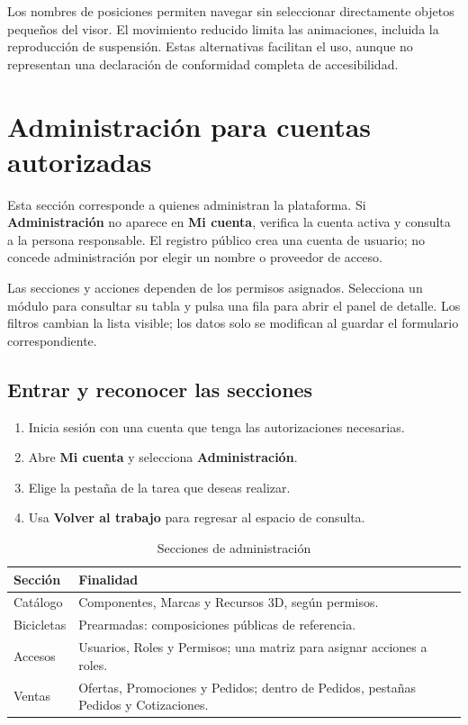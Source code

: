 \documentclass[12pt,letterpaper]{article}
\newenvironment{tabla}{\begingroup\singlespacing\small\setlength{\tabcolsep}{5pt}\renewcommand{\arraystretch}{1.25}}{\endgroup}
\newcommand{\control}[1]{\textbf{#1}}
\begin{document}
Los nombres de posiciones permiten navegar sin seleccionar directamente objetos pequeños del visor. El movimiento reducido limita las animaciones, incluida la reproducción de suspensión. Estas alternativas facilitan el uso, aunque no representan una declaración de conformidad completa de accesibilidad.
\clearpage
\section{Administración para cuentas autorizadas}\label{sec:admin}
Esta sección corresponde a quienes administran la plataforma. Si \control{Administración} no aparece en \control{Mi cuenta}, verifica la cuenta activa y consulta a la persona responsable. El registro público crea una cuenta de usuario; no concede administración por elegir un nombre o proveedor de acceso.

Las secciones y acciones dependen de los permisos asignados. Selecciona un módulo para consultar su tabla y pulsa una fila para abrir el panel de detalle. Los filtros cambian la lista visible; los datos solo se modifican al guardar el formulario correspondiente.

\subsection{Entrar y reconocer las secciones}
\begin{enumerate}
\item Inicia sesión con una cuenta que tenga las autorizaciones necesarias.
\item Abre \control{Mi cuenta} y selecciona \control{Administración}.
\item Elige la pestaña de la tarea que deseas realizar.
\item Usa \control{Volver al trabajo} para regresar al espacio de consulta.
\end{enumerate}
\begin{table}[H]\caption{Secciones de administración}\label{tab:admin}\begin{tabla}\begin{tabularx}{\textwidth}{L{4cm}X}\toprule
Sección & Finalidad\\\midrule
Catálogo & Componentes, Marcas y Recursos 3D, según permisos.\\
Bicicletas & Prearmadas: composiciones públicas de referencia.\\
Accesos & Usuarios, Roles y Permisos; una matriz para asignar acciones a roles.\\
Ventas & Ofertas, Promociones y Pedidos; dentro de Pedidos, pestañas Pedidos y Cotizaciones.\\\bottomrule
\end{tabularx}\end{tabla}\end{table}
\end{document}
